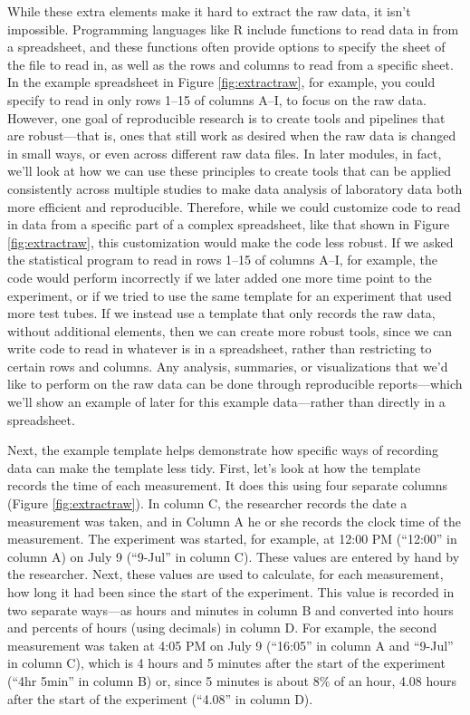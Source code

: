\documentclass[]{tufte-book}
\begin{document}
While these extra elements make it hard to extract the raw data, it isn't
impossible. Programming languages like R include functions to read data in from
a spreadsheet, and these functions often provide options to specify the sheet of
the file to read in, as well as the rows and columns to read from a specific
sheet. In the example spreadsheet in Figure \ref{fig:extractraw}, for example,
you could specify to read in only rows 1--15 of columns A--I, to focus on the
raw data. However, one goal of reproducible research is to create tools and
pipelines that are robust---that is, ones that still work as desired when the
raw data is changed in small ways, or even across different raw data files. In
later modules, in fact, we'll look at how we can use these principles to create
tools that can be applied consistently across multiple studies to make data
analysis of laboratory data both more efficient and reproducible. Therefore,
while we could customize code to read in data from a specific part of a complex
spreadsheet, like that shown in Figure \ref{fig:extractraw}, this customization
would make the code less robust. If we asked the statistical program to read in
rows 1--15 of columns A--I, for example, the code would perform incorrectly if
we later added one more time point to the experiment, or if we tried to use the
same template for an experiment that used more test tubes. If we instead use a
template that only records the raw data, without additional elements, then we
can create more robust tools, since we can write code to read in whatever is in
a spreadsheet, rather than restricting to certain rows and columns. Any analysis,
summaries, or visualizations that we'd like to perform on the raw data can be
done through reproducible reports---which we'll show an example of later for
this example data---rather than directly in a spreadsheet.

Next, the example template helps demonstrate how specific ways of recording data
can make the template less tidy. First, let's look at how the template records
the time of each measurement. It does this using four separate columns
(Figure \ref{fig:extractraw}). In column C, the researcher records the date a
measurement was taken, and in Column A he or she records the clock time of the
measurement. The experiment was started, for example, at 12:00 PM (``12:00'' in column A)
on July 9 (``9-Jul'' in column C). These values are entered by hand by the researcher.
Next, these values are used to calculate, for each measurement, how long it had been
since the start of the experiment. This value is recorded in two separate ways---as
hours and minutes in column B and converted into hours and percents of hours (using
decimals) in column D. For example, the second measurement was taken at 4:05 PM
on July 9 (``16:05'' in column A and ``9-Jul'' in column C), which is 4 hours and 5 minutes
after the start of the experiment (``4hr 5min'' in column B) or, since 5 minutes is about
8\% of an hour, 4.08 hours after the start of the experiment (``4.08'' in column D).
\end{document}
